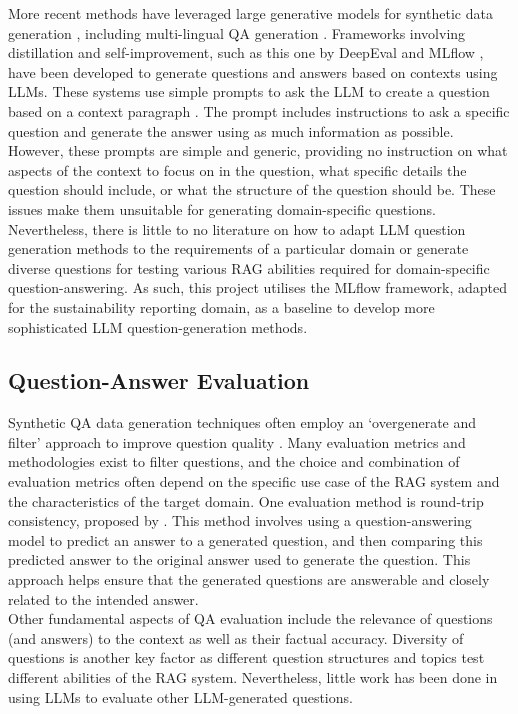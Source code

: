 More recent methods have leveraged large generative models for synthetic data generation \cite{guo2024generativeaisyntheticdata}, including multi-lingual QA generation \cite{han2023multilingual}. Frameworks involving distillation and self-improvement, such as this one by DeepEval \cite{deepeval_qa_gen} and MLflow \cite{mlflow}, have been developed to generate questions and answers based on contexts using LLMs. These systems use simple prompts to ask the LLM to create a question based on a context paragraph \cite{mlflow}. The prompt includes instructions to ask a specific question and generate the answer using as much information as possible. However, these prompts are simple and generic, providing no instruction on what aspects of the context to focus on in the question, what specific details the question should include, or what the structure of the question should be. These issues make them unsuitable for generating domain-specific questions. Nevertheless, there is little to no literature on how to adapt LLM question generation methods to the requirements of a particular domain or generate diverse questions for testing various RAG abilities required for domain-specific question-answering. As such, this project utilises the MLflow \cite{mlflow} framework, adapted for the sustainability reporting domain, as a baseline to develop more sophisticated LLM question-generation methods.


\subsection{Question-Answer Evaluation}

Synthetic QA data generation techniques often employ an `overgenerate and filter' approach to improve question quality \cite{puri2020training}. Many evaluation metrics and methodologies exist to filter questions, and the choice and combination of evaluation metrics often depend on the specific use case of the RAG system and the characteristics of the target domain. One evaluation method is round-trip consistency, proposed by \cite{alberti2019synthetic}. This method involves using a question-answering model to predict an answer to a generated question, and then comparing this predicted answer to the original answer used to generate the question. This approach helps ensure that the generated questions are answerable and closely related to the intended answer. \\

Other fundamental aspects of QA evaluation include the relevance of questions (and answers) to the context as well as their factual accuracy. Diversity of questions is another key factor as different question structures and topics test different abilities of the RAG system. Nevertheless, little work has been done in using LLMs to evaluate other LLM-generated questions. 


